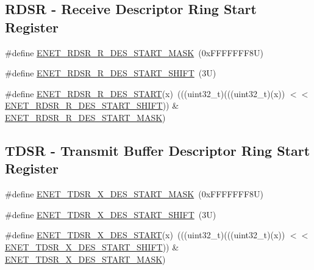 \subsection*{R\+D\+SR -\/ Receive Descriptor Ring Start Register}
\begin{DoxyCompactItemize}
\item 
\#define \mbox{\hyperlink{group___e_n_e_t___register___masks_gab49b1d2ba8d51579828593849f9f9f0d}{E\+N\+E\+T\+\_\+\+R\+D\+S\+R\+\_\+\+R\+\_\+\+D\+E\+S\+\_\+\+S\+T\+A\+R\+T\+\_\+\+M\+A\+SK}}~(0x\+F\+F\+F\+F\+F\+F\+F8\+U)
\item 
\#define \mbox{\hyperlink{group___e_n_e_t___register___masks_ga1afaef178575034556d8e580d5fe0c84}{E\+N\+E\+T\+\_\+\+R\+D\+S\+R\+\_\+\+R\+\_\+\+D\+E\+S\+\_\+\+S\+T\+A\+R\+T\+\_\+\+S\+H\+I\+FT}}~(3\+U)
\item 
\#define \mbox{\hyperlink{group___e_n_e_t___register___masks_ga49d871cbe8f6320beb777362b427fea6}{E\+N\+E\+T\+\_\+\+R\+D\+S\+R\+\_\+\+R\+\_\+\+D\+E\+S\+\_\+\+S\+T\+A\+RT}}(x)~(((uint32\+\_\+t)(((uint32\+\_\+t)(x)) $<$$<$ \mbox{\hyperlink{group___e_n_e_t___register___masks_ga1afaef178575034556d8e580d5fe0c84}{E\+N\+E\+T\+\_\+\+R\+D\+S\+R\+\_\+\+R\+\_\+\+D\+E\+S\+\_\+\+S\+T\+A\+R\+T\+\_\+\+S\+H\+I\+FT}})) \& \mbox{\hyperlink{group___e_n_e_t___register___masks_gab49b1d2ba8d51579828593849f9f9f0d}{E\+N\+E\+T\+\_\+\+R\+D\+S\+R\+\_\+\+R\+\_\+\+D\+E\+S\+\_\+\+S\+T\+A\+R\+T\+\_\+\+M\+A\+SK}})
\end{DoxyCompactItemize}
\subsection*{T\+D\+SR -\/ Transmit Buffer Descriptor Ring Start Register}
\begin{DoxyCompactItemize}
\item 
\#define \mbox{\hyperlink{group___e_n_e_t___register___masks_ga0fd3699cfea6036741e57fde2c14259b}{E\+N\+E\+T\+\_\+\+T\+D\+S\+R\+\_\+\+X\+\_\+\+D\+E\+S\+\_\+\+S\+T\+A\+R\+T\+\_\+\+M\+A\+SK}}~(0x\+F\+F\+F\+F\+F\+F\+F8\+U)
\item 
\#define \mbox{\hyperlink{group___e_n_e_t___register___masks_ga46f0734fb316af30bafaaaf1f33cc24a}{E\+N\+E\+T\+\_\+\+T\+D\+S\+R\+\_\+\+X\+\_\+\+D\+E\+S\+\_\+\+S\+T\+A\+R\+T\+\_\+\+S\+H\+I\+FT}}~(3\+U)
\item 
\#define \mbox{\hyperlink{group___e_n_e_t___register___masks_ga53841baf2c5ce76e02763f85cb9bca43}{E\+N\+E\+T\+\_\+\+T\+D\+S\+R\+\_\+\+X\+\_\+\+D\+E\+S\+\_\+\+S\+T\+A\+RT}}(x)~(((uint32\+\_\+t)(((uint32\+\_\+t)(x)) $<$$<$ \mbox{\hyperlink{group___e_n_e_t___register___masks_ga46f0734fb316af30bafaaaf1f33cc24a}{E\+N\+E\+T\+\_\+\+T\+D\+S\+R\+\_\+\+X\+\_\+\+D\+E\+S\+\_\+\+S\+T\+A\+R\+T\+\_\+\+S\+H\+I\+FT}})) \& \mbox{\hyperlink{group___e_n_e_t___register___masks_ga0fd3699cfea6036741e57fde2c14259b}{E\+N\+E\+T\+\_\+\+T\+D\+S\+R\+\_\+\+X\+\_\+\+D\+E\+S\+\_\+\+S\+T\+A\+R\+T\+\_\+\+M\+A\+SK}})
\end{DoxyCompactItemize}
